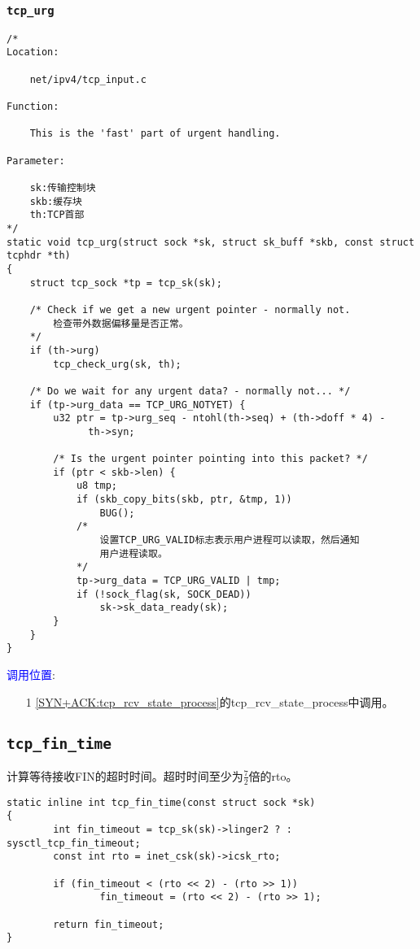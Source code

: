 		\subsubsection{\texttt{tcp_urg}}
			\label{TCPUrgent:tcp_urg}
\begin{verbatim}
/*
Location:

	net/ipv4/tcp_input.c

Function:

	This is the 'fast' part of urgent handling. 

Parameter:

	sk:传输控制块
	skb:缓存块
	th:TCP首部
*/
static void tcp_urg(struct sock *sk, struct sk_buff *skb, const struct tcphdr *th)
{
	struct tcp_sock *tp = tcp_sk(sk);

	/* Check if we get a new urgent pointer - normally not. 
		检查带外数据偏移量是否正常。
	*/
	if (th->urg)
		tcp_check_urg(sk, th);

	/* Do we wait for any urgent data? - normally not... */
	if (tp->urg_data == TCP_URG_NOTYET) {
		u32 ptr = tp->urg_seq - ntohl(th->seq) + (th->doff * 4) -
			  th->syn;

		/* Is the urgent pointer pointing into this packet? */
		if (ptr < skb->len) {
			u8 tmp;
			if (skb_copy_bits(skb, ptr, &tmp, 1))
				BUG();
			/*
				设置TCP_URG_VALID标志表示用户进程可以读取，然后通知
				用户进程读取。
			*/
			tp->urg_data = TCP_URG_VALID | tmp;
			if (!sock_flag(sk, SOCK_DEAD))
				sk->sk_data_ready(sk);
		}
	}
}
\end{verbatim}	

		\textcolor{blue}{调用位置}:

			\begin{enumerate}
			\item[1]		\ref{SYN+ACK:tcp_rcv_state_process}的tcp\_rcv\_state\_process中调用。
			\end{enumerate}

	\subsection{\texttt{tcp_fin_time}}
		计算等待接收FIN的超时时间。超时时间至少为$\frac{7}{2}$倍的rto。
\begin{verbatim}
static inline int tcp_fin_time(const struct sock *sk)
{
        int fin_timeout = tcp_sk(sk)->linger2 ? : sysctl_tcp_fin_timeout;
        const int rto = inet_csk(sk)->icsk_rto;

        if (fin_timeout < (rto << 2) - (rto >> 1))
                fin_timeout = (rto << 2) - (rto >> 1);

        return fin_timeout;
}
\end{verbatim}
